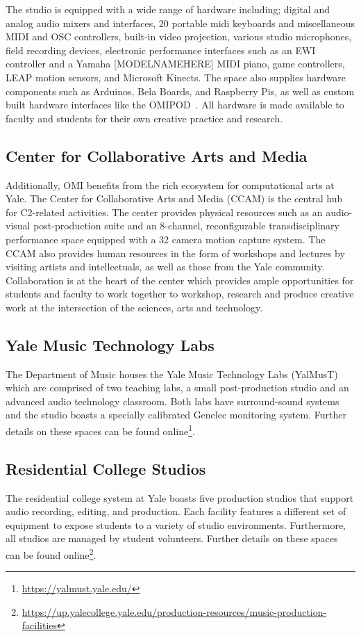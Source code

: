 The studio is equipped with a wide range of hardware including; digital and analog audio mixers and interfaces, 20 portable midi keyboards and miscellaneous MIDI and OSC controllers, built-in video projection, various studio microphones, field recording devices, electronic performance interfaces such as an EWI controller and a Yamaha [MODELNAMEHERE] MIDI piano, game controllers, LEAP motion sensors, and Microsoft Kinects. The space also supplies hardware components such as Arduinos, Bela Boards, and Raspberry Pis, as well as custom built hardware interfaces like the OMIPOD~\cite{omipod}. All hardware is made available to faculty and students for their own creative practice and research. 

\subsection{Center for Collaborative Arts and Media}

Additionally, OMI benefits from the rich ecosystem for computational arts at Yale. The Center for Collaborative Arts and Media (CCAM) is the central hub for C2-related activities. The center provides physical resources such as an audio-visual post-production suite and an 8-channel, reconfigurable transdisciplinary performance space equipped with a 32 camera motion capture system. The CCAM also provides human resources in the form of workshops and lectures by visiting artists and intellectuals, as well as those from the Yale community. Collaboration is at the heart of the center which provides ample opportunities for students and faculty to work together to workshop, research and produce creative work at the intersection of the sciences, arts and technology.

\subsection{Yale Music Technology Labs}

The Department of Music houses the Yale Music Technology Labs (YalMusT) which are comprised of two teaching labs, a small post-production studio and an advanced audio technology classroom. Both labs have surround-sound systems and the studio boasts a specially calibrated Genelec monitoring system. Further details on these spaces can be found online\footnote{\url{https://yalmust.yale.edu/}}.

\subsection{Residential College Studios}

The residential college system at Yale boasts five production studios that support audio recording, editing, and production. Each facility features a different set of equipment to expose students to a variety of studio environments. Furthermore, all studios are managed by student volunteers. Further details on these spaces can be found online\footnote{\url{https://up.yalecollege.yale.edu/production-resources/music-production-facilities}}.

